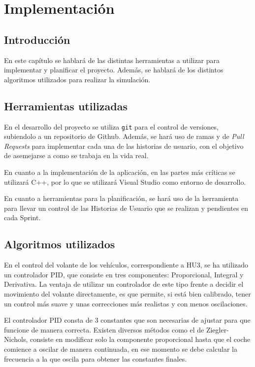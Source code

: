 \chapter{Implementación}

\section{Introducción}

En este capítulo se hablará de las distintas herramientas a utilizar para implementar y planificar el proyecto. Además, se hablará de los distintos algoritmos utilizados para realizar la simulación.

\section{Herramientas utilizadas}
En el desarrollo del proyecto se utiliza \verb|git| para el control de versiones, subiendolo a un repositorio de Github. Además, se hará uso de ramas y de \textit{Pull Requests} para implementar cada una de las historias de usuario, con el objetivo de asemejarse a como se trabaja en la vida real.

\bigskip

En cuanto a la implementación de la aplicación, en las partes más críticas se utilizará C++, por lo que se utilizará Visual Studio como entorno de desarrollo.

\bigskip

En cuanto a herramientas para la planificación, se hará uso de la herramienta \planApp para llevar un control de las Historias de Usuario que se realizan y pendientes en cada Sprint.


\section{Algoritmos utilizados}
En el control del volante de los vehículos, correspondiente a HU3, se ha utilizado un controlador PID, que consiste en tres componentes: Proporcional, Integral y Derivativa. La ventaja de utilizar un controlador de este tipo frente a decidir el movimiento del volante directamente, es que permite, si está bien calibrado, tener un control más suave y unas correcciones más realistas y con menos oscilaciones.

\bigskip
El controlador PID consta de 3 constantes que son necesarias de ajustar para que funcione de manera correcta. Existen diversos métodos como el de Ziegler-Nichols\cite{enwiki:1140258750}, consiste en modificar solo la componente proporcional hasta que el coche comience a oscilar de manera continuada, en ese momento se debe calcular la frecuencia a la que oscila para obtener las constantes finales. 

